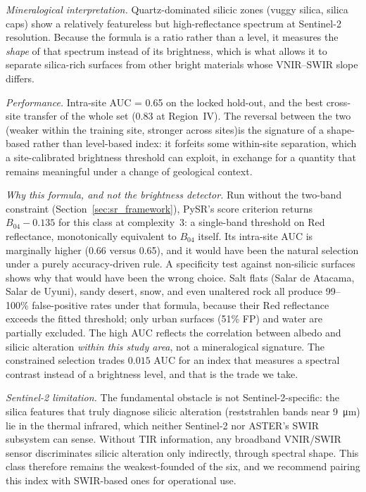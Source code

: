 \documentclass[preprint,authoryear,number]{elsarticle}
\begin{document}
\emph{Mineralogical interpretation.} Quartz-dominated silicic zones (vuggy silica, silica caps) show a relatively featureless but high-reflectance spectrum at Sentinel-2 resolution. Because the formula is a ratio rather than a level, it measures the \emph{shape} of that spectrum instead of its brightness, which is what allows it to separate silica-rich surfaces from other bright materials whose VNIR--SWIR slope differs.

\emph{Performance.} Intra-site AUC = 0.65 on the locked hold-out, and the best cross-site transfer of the whole set (0.83 at Region~IV). The reversal between the two (weaker within the training site, stronger across sites)is the signature of a shape-based rather than level-based index: it forfeits some within-site separation, which a site-calibrated brightness threshold can exploit, in exchange for a quantity that remains meaningful under a change of geological context.

\emph{Why this formula, and not the brightness detector.} Run without the two-band constraint (Section~\ref{sec:sr_framework}), PySR's score criterion returns $B_{04} - 0.135$ for this class at complexity~3: a single-band threshold on Red reflectance, monotonically equivalent to $B_{04}$ itself. Its intra-site AUC is marginally higher (0.66 versus 0.65), and it would have been the natural selection under a purely accuracy-driven rule. A specificity test against non-silicic surfaces shows why that would have been the wrong choice. Salt flats (Salar de Atacama, Salar de Uyuni), sandy desert, snow, and even unaltered rock all produce 99--100\% false-positive rates under that formula, because their Red reflectance exceeds the fitted threshold; only urban surfaces (51\% FP) and water are partially excluded. The high AUC reflects the correlation between albedo and silicic alteration \emph{within this study area}, not a mineralogical signature. The constrained selection trades $0.015$ AUC for an index that measures a spectral contrast instead of a brightness level, and that is the trade we take.

\emph{Sentinel-2 limitation.} The fundamental obstacle is not Sentinel-2-specific: the silica features that truly diagnose silicic alteration (reststrahlen bands near \SI{9}{\micro\meter}) lie in the thermal infrared, which neither Sentinel-2 nor ASTER's SWIR subsystem can sense. Without TIR information, any broadband VNIR/SWIR sensor discriminates silicic alteration only indirectly, through spectral shape. This class therefore remains the weakest-founded of the six, and we recommend pairing this index with SWIR-based ones for operational use.
\end{document}
